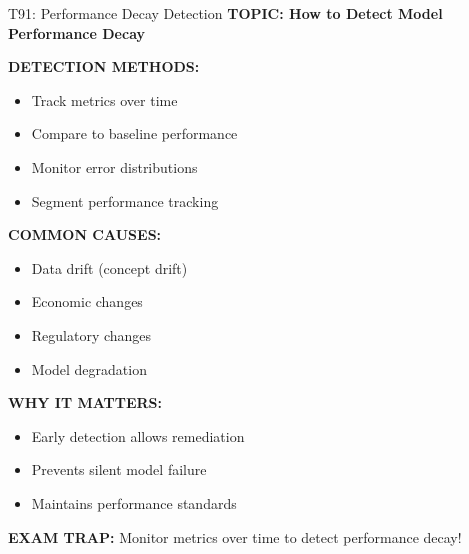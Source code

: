 \documentclass[8pt]{beamer}
\begin{document}
	\begin{frame}{T91: Performance Decay Detection}
		\fontsize{6.5}{7.5}\selectfont
		\textbf{TOPIC: How to Detect Model Performance Decay}
		
		\vspace{0.1cm}
		\textbf{DETECTION METHODS:}
		\begin{itemize}
			\item Track metrics over time
			\item Compare to baseline performance
			\item Monitor error distributions
			\item Segment performance tracking
		\end{itemize}
		
		\vspace{0.1cm}
		\textbf{COMMON CAUSES:}
		\begin{itemize}
			\item Data drift (concept drift)
			\item Economic changes
			\item Regulatory changes
			\item Model degradation
		\end{itemize}
		
		\vspace{0.1cm}
		\textbf{WHY IT MATTERS:}
		\begin{itemize}
			\item Early detection allows remediation
			\item Prevents silent model failure
			\item Maintains performance standards
		\end{itemize}
		
		\textcolor{myred}{\textbf{EXAM TRAP:}} Monitor metrics over time to detect \textcolor{myblue}{performance decay}!
	\end{frame}
	
\end{document}
